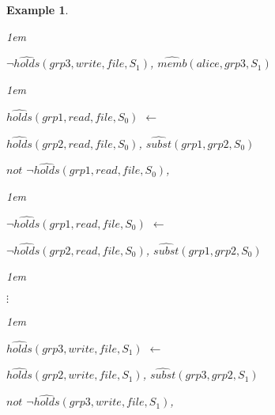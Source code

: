 \documentclass[11pt]{report}
\newtheorem{vexample}{Example}[chapter]
\newenvironment{vquote}
{
  \begin{list}{}{\leftmargin 1em}\item[]
}
{
  \end{list}
}
\begin{document}
\begin{vexample}
\begin{enumerate}
\begin{vquote}
                  \hspace{1em}
                  $\lnot\hat{holds}(grp3, write, file, S_{1})$,
                  $\hat{memb}(alice, grp3, S_{1})$
                \end{vquote}
               
                \begin{vquote}
                  $\hat{holds}(grp1, read, file, S_{0})$ $\leftarrow$
               
                  \hspace{1em}
                  $\hat{holds}(grp2, read, file, S_{0})$,
                  $\hat{subst}(grp1, grp2, S_{0})$

                  \hspace{1em}
                  $not$ $\lnot\hat{holds}(grp1, read, file, S_{0})$,
                \end{vquote}
               
                \begin{vquote}
                  $\lnot\hat{holds}(grp1, read, file, S_{0})$ $\leftarrow$
               
                  \hspace{1em}
                  $\lnot\hat{holds}(grp2, read, file, S_{0})$,
                  $\hat{subst}(grp1, grp2, S_{0})$
                \end{vquote}
               
                \begin{vquote}
                  \hspace{2em}$\vdots$
                \end{vquote}
               
                \begin{vquote}
                  $\hat{holds}(grp3, write, file, S_{1})$ $\leftarrow$
               
                  \hspace{1em}
                  $\hat{holds}(grp2, write, file, S_{1})$,
                  $\hat{subst}(grp3, grp2, S_{1})$

                  \hspace{1em}
                  $not$ $\lnot\hat{holds}(grp3, write, file, S_{1})$,
                \end{vquote}
               

\end{enumerate}
\end{vexample}
\end{document}
